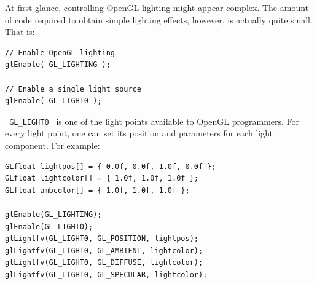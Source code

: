 %
At first glance, controlling OpenGL lighting might appear complex. 
The amount of code required to obtain simple lighting effects, 
however, is actually quite small. That is:
\begin{lstlisting}[caption={Lighting example}, label={code:lighting}, frame=trBL]
// Enable OpenGL lighting
glEnable( GL_LIGHTING );

// Enable a single light source
glEnable( GL_LIGHT0 );
\end{lstlisting}
%
\texttt{ GL\_LIGHT0 } is one of the light points available to 
OpenGL programmers. For every light point, one can set its 
position and parameters for each light component. For example:
%
\begin{lstlisting}[caption={Complex lighting example}, label={code:complexlighting}, frame=trBL]
GLfloat lightpos[] = { 0.0f, 0.0f, 1.0f, 0.0f };
GLfloat lightcolor[] = { 1.0f, 1.0f, 1.0f };
GLfloat ambcolor[] = { 1.0f, 1.0f, 1.0f };

glEnable(GL_LIGHTING);
glEnable(GL_LIGHT0);                        
glLightfv(GL_LIGHT0, GL_POSITION, lightpos);
glLightfv(GL_LIGHT0, GL_AMBIENT, lightcolor);
glLightfv(GL_LIGHT0, GL_DIFFUSE, lightcolor);
glLightfv(GL_LIGHT0, GL_SPECULAR, lightcolor);
\end{lstlisting}
%
